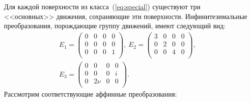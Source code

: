 \documentclass[../main.tex]{subfiles}
\begin{document}
Для каждой поверхности из класса~(\ref{eq:special}) существуют три <<основных>> движения, сохраняющие эти поверхности. Инфинитезимальные преобразования, порождающие группу движений, имеют следующий вид:
\begin{gather*}
E_1 =
\left(
\begin{array}{cccc}
 0 & 0 & 0 & 0 \\
 0 & 0 & 0 & 0 \\
 0 & 0 & 0 & 1 \\
\end{array}
\right),~
E_2 = \left(
\begin{array}{cccc}
 3 & 0 & 0 & 0 \\
 0 & 2 & 0 & 0 \\
 0 & 0 & 4 & 0 \\
\end{array}
\right),\nonumber \\
E_3 =
\left(
\begin{array}{cccc}
 0 & 0 & 0 & 0 \\
 0 & 0 & 0 & i \\
 0 & 2 \nu  & 0 & 0 \\
\end{array}
\right).
\end{gather*}
Рассмотрим соответствующие аффинные преобразования:
\end{document}
